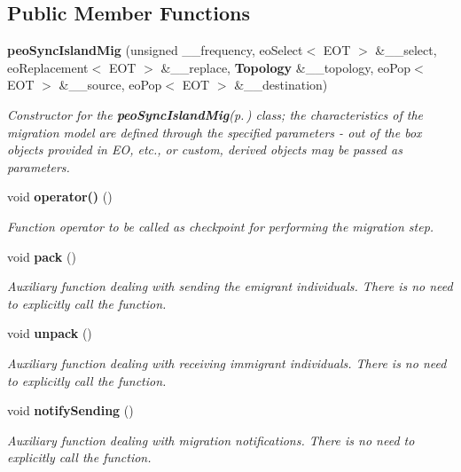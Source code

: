\subsection*{Public Member Functions}
\begin{CompactItemize}
\item 
{\bf peo\-Sync\-Island\-Mig} (unsigned \_\-\_\-frequency, eo\-Select$<$ EOT $>$ \&\_\-\_\-select, eo\-Replacement$<$ EOT $>$ \&\_\-\_\-replace, {\bf Topology} \&\_\-\_\-topology, eo\-Pop$<$ EOT $>$ \&\_\-\_\-source, eo\-Pop$<$ EOT $>$ \&\_\-\_\-destination)
\begin{CompactList}\small\item\em Constructor for the {\bf peo\-Sync\-Island\-Mig}{\rm (p.\,\pageref{classpeo_sync_island_mig})} class; the characteristics of the migration model are defined through the specified parameters - out of the box objects provided in EO, etc., or custom, derived objects may be passed as parameters. \item\end{CompactList}\item 
void {\bf operator()} ()
\begin{CompactList}\small\item\em Function operator to be called as checkpoint for performing the migration step. \item\end{CompactList}\item 
void {\bf pack} ()\label{classpeo_sync_island_mig_e334188141eeba9f7b78bc6716f819ad}

\begin{CompactList}\small\item\em Auxiliary function dealing with sending the emigrant individuals. There is no need to explicitly call the function. \item\end{CompactList}\item 
void {\bf unpack} ()\label{classpeo_sync_island_mig_85777bd9f709c5d4107799e8619948d1}

\begin{CompactList}\small\item\em Auxiliary function dealing with receiving immigrant individuals. There is no need to explicitly call the function. \item\end{CompactList}\item 
void {\bf notify\-Sending} ()\label{classpeo_sync_island_mig_8c427b3f91c19ff85f86930366b96008}

\begin{CompactList}\small\item\em Auxiliary function dealing with migration notifications. There is no need to explicitly call the function. \item\end{CompactList}\end{CompactItemize}
